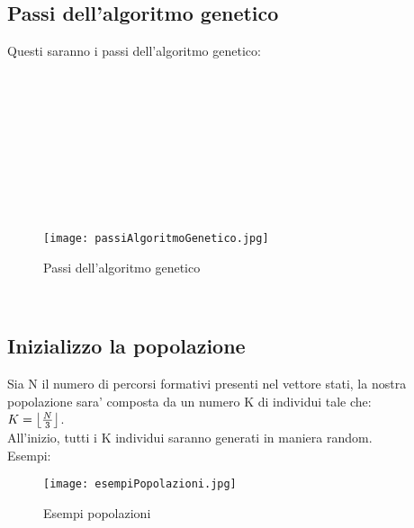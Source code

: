 \documentclass[10pt,a4paper]{article}
\begin{document}
    \subsection{Passi dell'algoritmo genetico}
      \label{passiDellAlgoritmoGeneticoSubsection}
      Questi saranno i passi dell'algoritmo genetico:
      \\\\\\\\\\\\\\\\\\\\
      \begin{figure}[h!]
        \centering
        \caption{Passi dell'algoritmo genetico}
        \texttt{[image: passiAlgoritmoGenetico.jpg]}
        \label{passiAlgoritmoGenetico}
      \end{figure}\\
      
    \subsection{Inizializzo la popolazione}
      \label{inizializzoLaPopolazioneSubsection}
      Sia N il numero di percorsi formativi presenti nel vettore stati, la nostra\\
      popolazione sara' composta da un numero K di individui tale che:\\ 
      $ K = \bigl\lfloor {N \over 3} \bigl\rfloor $.\\
      All'inizio, tutti i K individui saranno generati in maniera random.\\
      Esempi:
      \begin{figure}
        \centering
        \caption{Esempi popolazioni}
        \texttt{[image: esempiPopolazioni.jpg]}
        \label{esempiPopolazioni}
      \end{figure}
      \\\\\\\\\\\\\\\\\\\\\\\\\\\\\\\\\\\\\\\\
\end{document}
